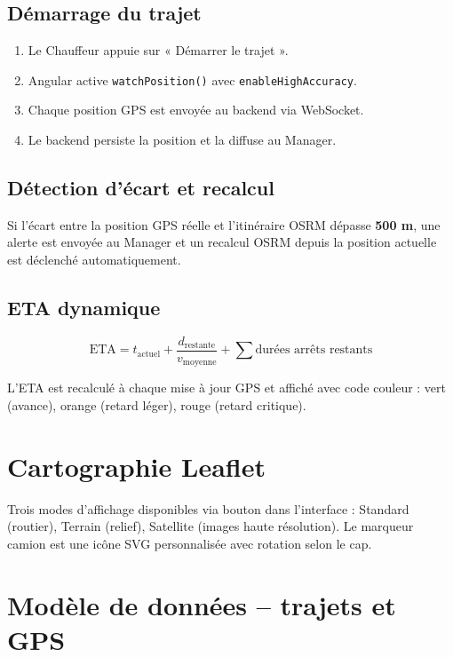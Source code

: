 \documentclass[12pt,a4paper]{report}
\begin{document}
\subsection{Démarrage du trajet}

\begin{enumerate}
  \item Le Chauffeur appuie sur « Démarrer le trajet ».
  \item Angular active \texttt{watchPosition()} avec \texttt{enableHighAccuracy}.
  \item Chaque position GPS est envoyée au backend via WebSocket.
  \item Le backend persiste la position et la diffuse au Manager.
\end{enumerate}

\subsection{Détection d'écart et recalcul}

Si l'écart entre la position GPS réelle et l'itinéraire OSRM dépasse
\textbf{500 m}, une alerte est envoyée au Manager et un recalcul OSRM
depuis la position actuelle est déclenché automatiquement.

\subsection{ETA dynamique}

\[
  \text{ETA} = t_{\text{actuel}} + \frac{d_{\text{restante}}}{v_{\text{moyenne}}}
  + \sum \text{durées arrêts restants}
\]

L'ETA est recalculé à chaque mise à jour GPS et affiché avec code couleur :
vert (avance), orange (retard léger), rouge (retard critique).

\section{Cartographie Leaflet}
\label{sec:ch4-leaflet}

Trois modes d'affichage disponibles via bouton dans l'interface :
Standard (routier), Terrain (relief), Satellite (images haute résolution).
Le marqueur camion est une icône SVG personnalisée avec rotation selon le cap.

\section{Modèle de données -- trajets et GPS}
\label{sec:ch4-modele}
\end{document}
